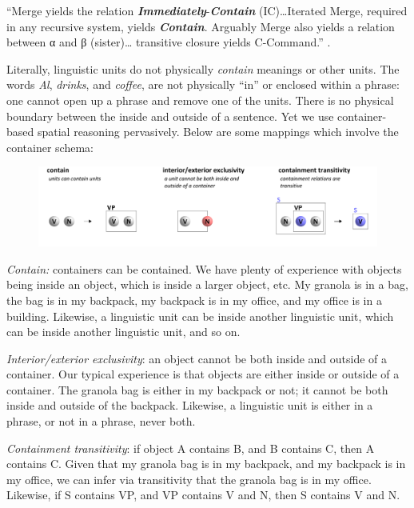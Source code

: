 “Merge yields the relation \textbf{\textit{Immediately}}{}-\textbf{\textit{Contain}} (IC)…Iterated Merge, required in any recursive system, yields \textbf{\textit{Contain}}. Arguably Merge also yields a relation between α and β (sister)… transitive closure yields C-Command.” \citep[3]{Chomsky2001b}.

  Literally, linguistic units do not physically \textit{contain} meanings or other units. The words \textit{Al}, \textit{drinks}, and \textit{coffee}, are not physically “in” or enclosed within a phrase: one cannot open up a phrase and remove one of the units. There is no physical boundary between the inside and outside of a sentence. Yet we use container-based spatial reasoning pervasively. Below are some mappings which involve the container schema:

  
\begin{figure}
\includegraphics[width=\textwidth]{figures/Tilsen-img32.png}
\caption{\missingcaption}
\label{fig:}
\end{figure}
 

\textit{Contain:} containers can be contained. We have plenty of experience with objects being inside an object, which is inside a larger object, etc. My granola is in a bag, the bag is in my backpack, my backpack is in my office, and my office is in a building. Likewise, a linguistic unit can be inside another linguistic unit, which can be inside another linguistic unit, and so on.

\textit{Interior/exterior exclusivity}: an object cannot be both inside and outside of a container. Our typical experience is that objects are either inside or outside of a container. The granola bag is either in my backpack or not; it cannot be both inside and outside of the backpack. Likewise, a linguistic unit is either in a phrase, or not in a phrase, never both.

\textit{Containment transitivity}: if object A contains B, and B contains C, then A contains C. Given that my granola bag is in my backpack, and my backpack is in my office, we can infer via transitivity that the granola bag is in my office. Likewise, if S contains VP, and VP contains V and N, then S contains V and N.

